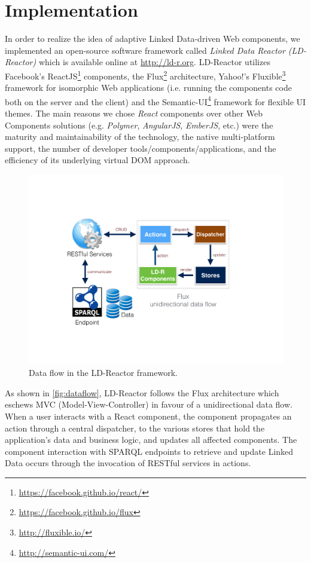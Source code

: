 \documentclass{llncs}
\begin{document}
\vspace{-1.5em}
\section{Implementation}
\label{sec:implementation}
In order to realize the idea of adaptive Linked Data-driven Web components, we implemented an open-source software framework called \emph{Linked Data Reactor (LD-Reactor)} which is available online at \url{http://ld-r.org}.
LD-Reactor utilizes Facebook's ReactJS\footnote{\url{https://facebook.github.io/react/}} components, the Flux\footnote{\url{https://facebook.github.io/flux}} architecture, Yahoo!'s Fluxible\footnote{\url{http://fluxible.io/}} framework for isomorphic Web applications (i.e. running the components code both on the server and the client) and the Semantic-UI\footnote{\url{http://semantic-ui.com/}} framework for flexible UI themes.
The main reasons we chose \emph{React} components over other  Web Components solutions (e.g. \emph{Polymer}, \emph{AngularJS}, \emph{EmberJS}, etc.) were the maturity and maintainability of the technology, the native multi-platform support, the number of developer tools/components/applications, and the efficiency of its underlying virtual DOM approach.

\begin{figure}[tb]
\center
  \includegraphics[width=.65\linewidth]{images/dataflow.pdf}
  \caption{Data flow in the LD-Reactor framework.}
  \label{fig:dataflow}
\end{figure}

As shown in \autoref{fig:dataflow}, LD-Reactor follows the Flux architecture which eschews MVC (Model-View-Controller) in favour of a unidirectional data flow.
When a user interacts with a React component, the component propagates an action through a central dispatcher, to the various stores that hold the application's data and business logic, and updates all affected components.
The component interaction with SPARQL endpoints to retrieve and update Linked Data occurs through the invocation of RESTful services in actions.
\end{document}
